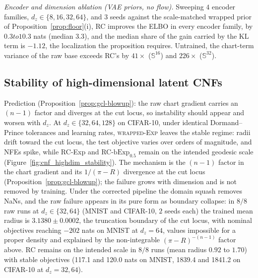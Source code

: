 \documentclass{article}
\theoremstyle{definition}
\theoremstyle{remark}
\newcommand{\RawExp}{\textsc{wrapped-Exp}}
\newcommand{\bExp}{\mathrm{bExp}}
\newcommand{\SSS}{\mathbb{S}}
\begin{document}
\emph{Encoder and dimension ablation (VAE priors, no flow).} Sweeping $4$ encoder families, $d_z\in\{8,16,32,64\}$, and $3$ seeds against the scale-matched wrapped prior of Proposition~\ref{prop:floor}(i), RC improves the ELBO in every encoder family, by $0.3 to 10.3$ nats (median $3.3$), and the median share of the gain carried by the KL term is $-1.12$, the localization the proposition requires. Untrained, the chart-term variance of the raw base exceeds RC's by $41\times$ ($\SSS^{16}$) and $226\times$ ($\SSS^{32}$).



\subsection{Stability of high-dimensional latent CNFs}
\label{sec:exp_stability}
Prediction (Proposition~\ref{prop:gcl-blowup}): the raw chart gradient carries an $(n{-}1)$ factor and diverges at the cut locus, so instability should appear and worsen with $d_z$. At $d_z\in\{32,64,128\}$ on CIFAR-10, under identical Dormand--Prince tolerances and learning rates, \RawExp{} leaves the stable regime: radii drift toward the cut locus, the test objective varies over orders of magnitude, and NFEs spike, while RC-Exp and RC-$\bExp_{0.5}$ remain on the intended geodesic scale (Figure~\ref{fig:cnf_highdim_stability}). The mechanism is the $(n{-}1)$ factor in the chart gradient and its $1/(\pi{-}R)$ divergence at the cut locus (Proposition~\ref{prop:gcl-blowup}); the failure grows with dimension and is not removed by training. Under the corrected pipeline the domain squash removes NaNs, and the raw failure appears in its pure form as boundary collapse: in $8/8$ raw runs at $d_z\in\{32,64\}$ (MNIST and CIFAR-10, $2$ seeds each) the trained mean radius is $3.1380\pm0.0002$, the truncation boundary of the cut locus, with nominal objectives reaching $-202$ nats on MNIST at $d_z{=}64$, values impossible for a proper density and explained by the non-integrable $(\pi-R)^{-(n-1)}$ factor above. RC remains on the intended scale in $8/8$ runs (mean radius $0.92$ to $1.70$) with stable objectives (117.1 and 120.0 nats on MNIST, 1839.4 and 1841.2 on CIFAR-10 at $d_z{=}32,64$).
\end{document}

